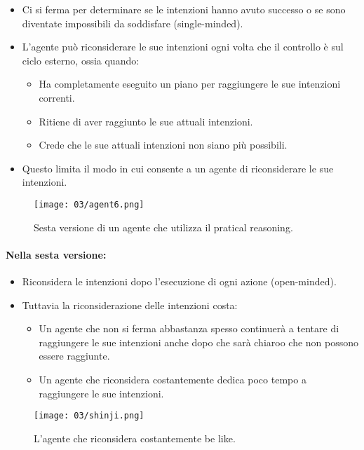 \begin{itemize}
  \item Ci si ferma per determinare se le intenzioni hanno avuto successo o se sono diventate impossibili da soddisfare (single-minded). 
  \item L'agente può riconsiderare le sue intenzioni ogni volta che il controllo è sul ciclo esterno, ossia quando:
    \begin{itemize}
      \item Ha completamente eseguito un piano per raggiungere le sue intenzioni correnti. 
      \item Ritiene di aver raggiunto le sue attuali intenzioni.
      \item Crede che le sue attuali intenzioni non siano più possibili.
    \end{itemize}
  \item Questo limita il modo in cui consente a un agente di riconsiderare le sue intenzioni.
\end{itemize}
\pagebreak
\begin{figure}[!h]
    \centering
    \texttt{[image: 03/agent6.png]}
  \caption{Sesta versione di un agente che utilizza il pratical reasoning.}
\end{figure}

\paragraph{Nella sesta versione:}

\begin{itemize}
  \item Riconsidera le intenzioni dopo l'esecuzione di ogni azione (open-minded).
  \item Tuttavia la riconsiderazione delle intenzioni costa: 
    \begin{itemize}
      \item Un agente che non si ferma abbastanza spesso continuerà a tentare di raggiungere le sue intenzioni anche dopo che sarà chiaroo che non possono essere raggiunte. 
      \item Un agente che riconsidera costantemente dedica poco tempo a raggiungere le sue intenzioni.
    \end{itemize}
\end{itemize}

\begin{figure}[!h]
    \centering
    \texttt{[image: 03/shinji.png]}
  \caption{L'agente che riconsidera costantemente be like.}
\end{figure}

